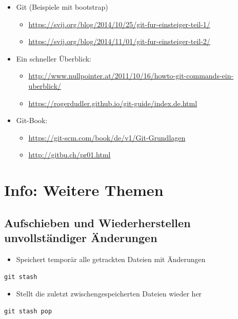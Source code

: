 \documentclass[11pt]{article}
\begin{document}
\begin{itemize}
\item Git (Beispiele mit bootstrap)
\begin{itemize}
\item \url{https://svij.org/blog/2014/10/25/git-fur-einsteiger-teil-1/}
\item \url{https://svij.org/blog/2014/11/01/git-fur-einsteiger-teil-2/}
\end{itemize}

\item Ein schneller Überblick:
\begin{itemize}
\item \url{http://www.nullpointer.at/2011/10/16/howto-git-commands-ein-uberblick/}
\item \url{https://rogerdudler.github.io/git-guide/index.de.html}
\end{itemize}
\end{itemize}


\begin{itemize}
\item Git-Book:
\begin{itemize}
\item \url{https://git-scm.com/book/de/v1/Git-Grundlagen}
\item \url{http://gitbu.ch/pr01.html}
\end{itemize}
\end{itemize}





\section{Info: Weitere Themen}
\label{sec:orgc9dc4ce}
\subsection{Aufschieben und Wiederherstellen unvollständiger Änderungen}
\label{sec:org6589e1b}

\begin{itemize}
\item Speichert temporär alle getrackten Dateien mit Änderungen
\end{itemize}

\begin{verbatim}
git stash
\end{verbatim}

\begin{itemize}
\item Stellt die zuletzt zwischengespeicherten Dateien wieder her
\end{itemize}
\begin{verbatim}
git stash pop
\end{verbatim}
\end{document}
